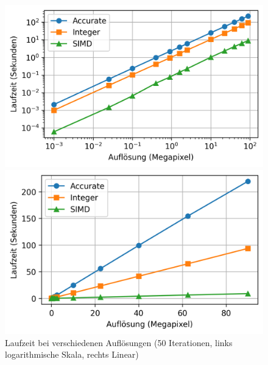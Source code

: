\documentclass[course=erap]{aspdoc}
\begin{document}
\begin{figure}
    \begin{minipage}[t]{.5\linewidth}
        \centering
        \includegraphics[width=\linewidth]{Image/Laufzeit/Laufzeit_log.png}
    \end{minipage}
    \begin{minipage}[t]{.5\linewidth}
        \centering
        \includegraphics[width=\linewidth]{Image/Laufzeit/Laufzeit_linear.png}
    \end{minipage}
    \caption{Laufzeit bei verschiedenen Auflösungen (50 Iterationen, links logarithmische Skala, rechts Linear)}
    \label{fig:runtime}
\end{figure}
\end{document}
